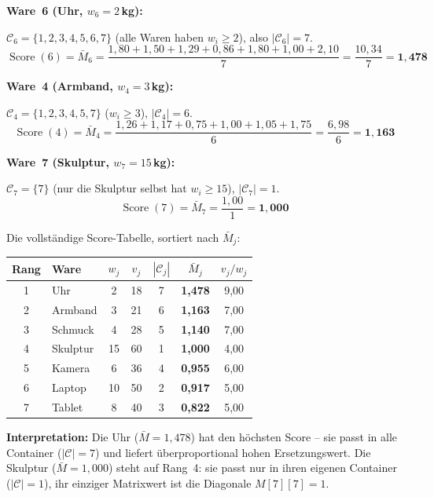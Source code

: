 \documentclass[a4paper,11pt]{article}
\begin{document}
\medskip
\noindent
\textbf{Ware~6 (Uhr, $w_6=2$\,kg):}

$\mathcal{C}_6 = \{1,2,3,4,5,6,7\}$ (alle Waren haben $w_i \ge 2$),
also $|\mathcal{C}_6| = 7$.
\[
\operatorname{Score}(6) = \bar{M}_6 = \frac{1{,}80 + 1{,}50 + 1{,}29 + 0{,}86 + 1{,}80 + 1{,}00 + 2{,}10}{7}
= \frac{10{,}34}{7} = \mathbf{1{,}478}
\]

\medskip
\noindent
\textbf{Ware~4 (Armband, $w_4=3$\,kg):}

$\mathcal{C}_4 = \{1,2,3,4,5,7\}$ ($w_i \ge 3$),
$|\mathcal{C}_4| = 6$.
\[
\operatorname{Score}(4) = \bar{M}_4 = \frac{1{,}26 + 1{,}17 + 0{,}75 + 1{,}00 + 1{,}05 + 1{,}75}{6}
= \frac{6{,}98}{6} = \mathbf{1{,}163}
\]

\medskip
\noindent
\textbf{Ware~7 (Skulptur, $w_7=15$\,kg):}

$\mathcal{C}_7 = \{7\}$ (nur die Skulptur selbst hat $w_i \ge 15$),
$|\mathcal{C}_7| = 1$.
\[
\operatorname{Score}(7) = \bar{M}_7 = \frac{1{,}00}{1} = \mathbf{1{,}000}
\]

\medskip
\noindent
Die vollständige Score-Tabelle, sortiert nach $\bar{M}_j$:

\begin{center}
\renewcommand{\arraystretch}{1.2}
\begin{tabular}{clccccc}
\toprule
Rang & Ware & $w_j$ & $v_j$ & $|\mathcal{C}_j|$
  & $\bar{M}_j$ & $v_j/w_j$ \\
\midrule
\rowcolor{teallight}
1 & Uhr      & 2  & 18 & 7 & \textbf{1{,}478} & 9{,}00 \\
\rowcolor{greenlight}
2 & Armband  & 3  & 21 & 6 & \textbf{1{,}163} & 7{,}00 \\
\rowcolor{greenlight}
3 & Schmuck  & 4  & 28 & 5 & \textbf{1{,}140} & 7{,}00 \\
4 & Skulptur & 15 & 60 & 1 & \textbf{1{,}000} & 4{,}00 \\
5 & Kamera   & 6  & 36 & 4 & \textbf{0{,}955} & 6{,}00 \\
6 & Laptop   & 10 & 50 & 2 & \textbf{0{,}917} & 5{,}00 \\
7 & Tablet   & 8  & 40 & 3 & \textbf{0{,}822} & 5{,}00 \\
\bottomrule
\end{tabular}
\end{center}

\noindent
\textbf{Interpretation:}
Die Uhr ($\bar{M} = 1{,}478$) hat den höchsten Score --
sie passt in alle Container ($|\mathcal{C}|=7$) und liefert
überproportional hohen Ersetzungswert.
Die Skulptur ($\bar{M} = 1{,}000$) steht auf Rang~4:
sie passt nur in ihren eigenen Container ($|\mathcal{C}|=1$),
ihr einziger Matrixwert ist die Diagonale $M[7][7]=1$.
\end{document}
